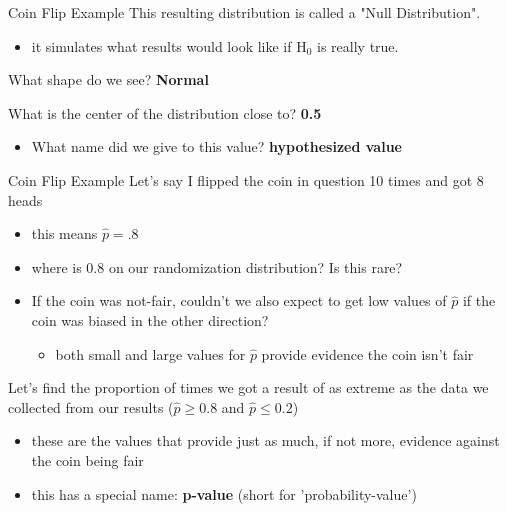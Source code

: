 \documentclass{beamer}
\begin{document}
\begin{frame}{Coin Flip Example}
This resulting distribution is called a "Null Distribution".
\begin{itemize}
    \item it simulates what results would look like if H$_0$ is really true.
\end{itemize} \vspace{8mm}

What shape do we see? \textbf{Normal} \vspace{8mm}

What is the center of the distribution close to? \textbf{0.5}
\begin{itemize}
    \item What name did we give to this value? \textbf{hypothesized value}
\end{itemize}\vspace{8mm}
\end{frame}

\begin{frame}{Coin Flip Example}
Let's say I flipped the coin in question 10 times and got 8 heads
\begin{itemize}
    \item this means $\widehat{p} = .8$
    \item where is 0.8 on our randomization distribution? Is this rare?
    \item If the coin was not-fair, couldn't we also expect to get low values of $\widehat{p}$ if the coin was biased in the other direction?
    \begin{itemize}
        \item both small and large values for $\widehat{p}$ provide evidence the coin isn't fair
    \end{itemize}
\end{itemize} \vspace{8mm}

Let's find the proportion of times we got a result of as extreme as the data we collected from our results ($\widehat{p} \geq 0.8$ and $\widehat{p} \leq 0.2$)
\begin{itemize}
    \item these are the values that provide just as much, if not more, evidence against the coin being fair
    \item this has a special name: \textbf{p-value} (short for 'probability-value')
\end{itemize} \vspace{8mm}
\end{frame}
\end{document}
